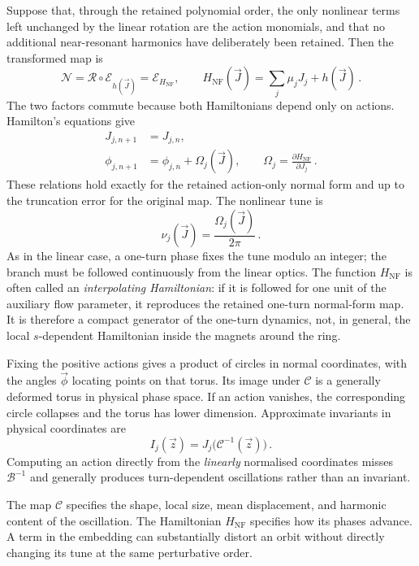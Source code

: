 Suppose that, through the retained polynomial order, the only nonlinear terms
left unchanged by the linear rotation are the action monomials, and that no
additional near-resonant harmonics have deliberately been retained.  Then the
transformed map is
\begin{equation}\label{eq:nnf-action-normal-form}
    \mathcal N = \mathcal R\circ\mathcal E_{h(\vec J)} = \mathcal E_{H_{\mathrm{NF}}},\qquad
    H_{\mathrm{NF}}(\vec J) = \sum_j\mu_jJ_j + h(\vec J)\,.
\end{equation}
The two factors commute because both Hamiltonians depend only on actions.
Hamilton's equations give
\begin{align}\label{eq:normal_one_turn}
    J_{j,n + 1}& = J_{j,n},\\
    \phi_{j,n + 1}& = \phi_{j,n} + \Omega_j(\vec J),\qquad
    \Omega_j = \frac{\partial H_{\mathrm{NF}}}{\partial J_j}\,.
\end{align}
These relations hold exactly for the retained action-only normal form and
up to the truncation error for the original map.  The nonlinear tune is
\begin{equation}\label{eq:nnf-tune}
    \nu_j(\vec J) = \frac{\Omega_j(\vec J)}{2\pi}\,.
\end{equation}
As in the linear case, a one-turn phase fixes the tune modulo an integer;
the branch must be followed continuously from the linear optics.  The function
$H_{\mathrm{NF}}$ is often called an \emph{interpolating Hamiltonian}: if it
is followed for one unit of the auxiliary flow parameter, it reproduces the
retained one-turn normal-form map.  It is therefore a compact generator of the
one-turn dynamics, not, in general, the local $s$-dependent Hamiltonian inside
the magnets around the ring.

Fixing the positive actions gives a product of circles in normal
coordinates, with the angles $\vec\phi$ locating points on that torus.
Its image under $\mathcal C$ is a generally deformed torus in physical
phase space.
If an action vanishes, the corresponding circle collapses and the torus
has lower dimension.  Approximate invariants in physical coordinates are
\begin{equation}
    I_j(\vec z) = J_j\bigl(\mathcal C^{-1}(\vec z)\bigr)\,.
\end{equation}
Computing an action directly from the \emph{linearly} normalised
coordinates misses $\mathcal B^{-1}$ and generally produces turn-dependent
oscillations rather than an invariant.

The map $\mathcal C$ specifies the shape, local size, mean displacement,
and harmonic content of the oscillation.  The Hamiltonian
$H_{\mathrm{NF}}$ specifies how its phases advance.  A term in the embedding
can substantially distort an orbit without directly changing its tune at
the same perturbative order.


